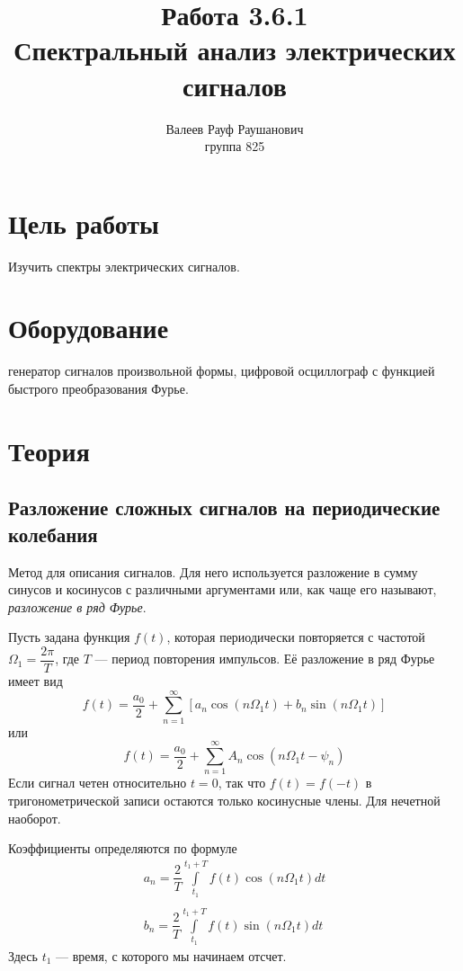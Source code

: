 \documentclass[a4paper, 12pt]{article}%
\author{Валеев Рауф Раушанович \\
группа 825}
\title{\textbf{Работа 3.6.1\\Спектральный анализ электрических сигналов}}
\begin{document}
\maketitle
\section*{Цель работы}
Изучить спектры электрических сигналов.
\section*{Оборудование}
генератор сигналов произвольной формы, цифровой осциллограф с функцией быстрого преобразования Фурье.
\section*{Теория}
\subsection*{Разложение сложных сигналов на периодические колебания}
Метод для описания сигналов. Для него используется разложение в сумму синусов и косинусов с различными аргументами или, как чаще его называют, \textit{разложение в ряд Фурье}.

Пусть задана функция $f(t)$, которая периодически повторяется с частотой $\Omega_1 = \dfrac{2\pi}{T}$, где $T$ --- период повторения импульсов. Её разложение в ряд Фурье имеет вид 
\begin{equation}
f(t) = \dfrac{a_0}{2} + \sum\limits_{n = 1}^{\infty}\left[a_n \cos \left(n \Omega_1t\right) + b_n \sin \left(n \Omega_1t\right)\right]
\end{equation}
или
\begin{equation}
f(t) = \dfrac{a_0}{2} + \sum\limits_{n = 1}^{\infty}A_n \cos \left(n\Omega_1t-\psi_n\right)
\end{equation}
Если сигнал четен относительно $t=0$, так что $f(t) = f(-t)$ в тригонометрической записи остаются только косинусные члены. Для нечетной наоборот.

Коэффициенты определяются по формуле
\begin{equation}
\begin{array}{c}
a_n  = \dfrac{2}{T}\int\limits_{t_1}^{t_1+T}f(t)\cos\left(n \Omega_1 t\right) dt\\
\\
b_n = \dfrac{2}{T}\int\limits_{t_1}^{t_1+T}f(t)\sin\left(n \Omega_1 t\right) dt
\end{array}
\end{equation}
Здесь $t_1$ --- время, с которого мы начинаем отсчет.
\end{document}

